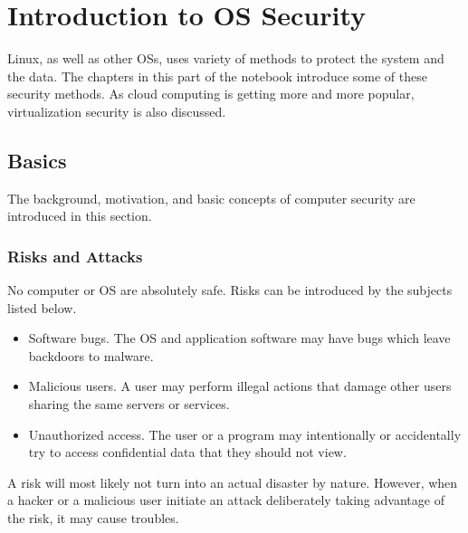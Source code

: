 \chapter{Introduction to OS Security}

Linux, as well as other OSs, uses variety of methods to protect the system and the data. The chapters in this part of the notebook introduce some of these security methods. As cloud computing is getting more and more popular, virtualization security is also discussed.

\section{Basics}

The background, motivation, and basic concepts of computer security are introduced in this section.

\subsection{Risks and Attacks}

No computer or OS are absolutely safe. Risks can be introduced by the subjects listed below.
\begin{itemize}
	\item Software bugs. The OS and application software may have bugs which leave backdoors to malware.
	\item Malicious users. A user may perform illegal actions that damage other users sharing the same servers or services.
	\item Unauthorized access. The user or a program may intentionally or accidentally try to access confidential data that they should not view.
\end{itemize}
A risk will most likely not turn into an actual disaster by nature. However, when a hacker or a malicious user initiate an attack deliberately taking advantage of the risk, it may cause troubles.

